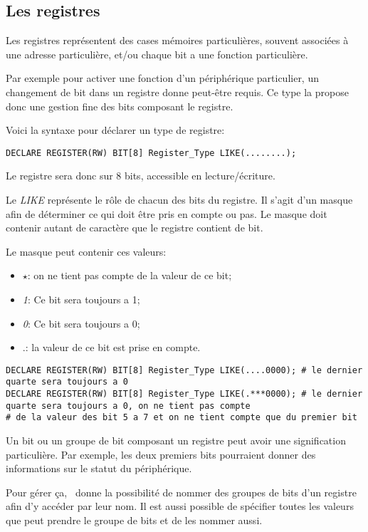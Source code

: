 \documentclass{rtxreport}
\begin{document}
\subsection{Les registres}
Les registres représentent des cases mémoires particulières, souvent associées
à une adresse particulière, et/ou chaque bit a une fonction particulière.

Par exemple pour activer une fonction d’un périphérique particulier, un
changement de bit dans un registre donne peut-être requis.
Ce type la propose donc une gestion fine des bits composant le registre.

Voici la syntaxe pour d\'eclarer un type de registre:
\begin{lstlisting}[caption=Declaration d'un type de registre sur un octet]
DECLARE REGISTER(RW) BIT[8] Register_Type LIKE(........);
\end{lstlisting}

Le registre sera donc sur 8 bits, accessible en lecture/écriture.

Le \emph{LIKE} représente le rôle de chacun des bits du registre. Il s'agit
d'un masque afin de déterminer ce qui doit être pris en compte ou pas.  Le
masque doit contenir autant de caractère que le registre contient de bit.

Le masque peut contenir ces valeurs:
\begin{itemize}
	\item $\star$: on ne tient pas compte de la valeur de ce bit;
	\item \emph{1}: Ce bit sera toujours a 1;
	\item \emph{0}: Ce bit sera toujours a 0;
	\item .: la valeur de ce bit est prise en compte.
\end{itemize}
\begin{lstlisting}[caption=Exemple de masque different]
DECLARE REGISTER(RW) BIT[8] Register_Type LIKE(....0000); # le dernier quarte sera toujours a 0
DECLARE REGISTER(RW) BIT[8] Register_Type LIKE(.***0000); # le dernier quarte sera toujours a 0, on ne tient pas compte
# de la valeur des bit 5 a 7 et on ne tient compte que du premier bit
\end{lstlisting}


Un bit ou un groupe de bit composant un registre peut avoir une signification particulière.
Par exemple, les deux premiers bits pourraient donner des informations sur le statut du
périphérique.

Pour gérer ça, \rtx\  donne la possibilité de nommer des groupes de bits d'un registre
afin d'y accéder par leur nom. Il est aussi possible de spécifier toutes les valeurs
que peut prendre le groupe de bits et de les nommer aussi.
\end{document}
